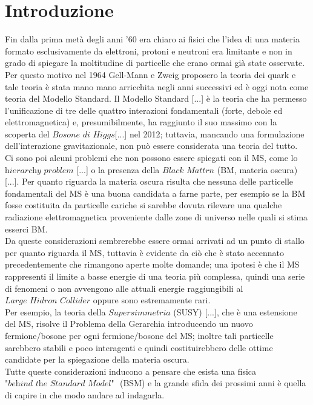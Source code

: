 %
\section{Introduzione}
\label{sec:introduzione}
%
Fin dalla prima metà degli anni '60 era chiaro ai fisici che l'idea di una materia formato esclusivamente da elettroni, protoni e neutroni era limitante e non in grado di spiegare la moltitudine di particelle che erano ormai già state osservate. Per questo motivo nel 1964 Gell-Mann e Zweig proposero la teoria dei quark e tale teoria è stata mano mano arricchita negli anni successivi ed è oggi nota come teoria del Modello Standard. 
Il Modello Standard [...] è la teoria che ha permesso l'unificazione di tre delle quattro interazioni fondamentali (forte, debole ed elettromagnetica) e, presumibilmente, ha raggiunto il suo massimo con la scoperta del $\textit{Bosone di Higgs}$[...] nel 2012; tuttavia, mancando una formulazione dell'interazione gravitazionale, non può essere considerata una teoria del tutto. \\
Ci sono poi alcuni problemi che non possono essere spiegati con il MS, come lo $\textit{hierarchy problem}$ [...]
o la presenza della $\textit{Black Mattrn}$ (BM, materia oscura) [...]. Per quanto riguarda la materia oscura risulta che nessuna delle particelle fondamentali del MS è una buona candidata a farne parte, per esempio se la BM fosse costituita da particelle cariche si sarebbe dovuta rilevare una qualche radiazione elettromagnetica proveniente dalle zone di universo nelle quali si stima esserci BM.  \\
Da queste considerazioni sembrerebbe essere ormai arrivati ad un punto di stallo per quanto riguarda il MS, tuttavia è evidente da ciò che è stato accennato precedentemente che rimangono aperte molte domande; una ipotesi è che il MS rappresenti il limite a basse energie di una teoria più complessa, quindi una serie di fenomeni o non avvengono alle attuali energie raggiungibili al $\textit{Large Hidron Collider}$ oppure sono estremamente rari. \\
Per esempio, la teoria della $\textit{Supersimmetria}$ (SUSY) [...], che è una estensione del MS, risolve il Problema della Gerarchia introducendo un nuovo fermione/bosone per ogni fermione/bosone del MS; inoltre tali particelle sarebbero stabili e poco interagenti e quindi costituirebbero delle ottime candidate per la spiegazione della materia oscura. \\
Tutte queste considerazioni inducono a pensare che esista una fisica $\textit{"behind the Standard Model" }$ (BSM) e la grande sfida dei prossimi anni è quella di capire in che modo andare ad indagarla. \\
